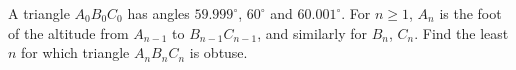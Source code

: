 A triangle $A_0B_0C_0$ has angles $59.999^\circ$, $60^\circ$ and $60.001^\circ$. For $n\ge1$, $A_n$ is the foot of the altitude from $A_{n-1}$ to $B_{n-1}C_{n-1}$, and similarly for $B_n$, $C_n$. Find the least $n$ for which triangle $A_nB_nC_n$ is obtuse.
